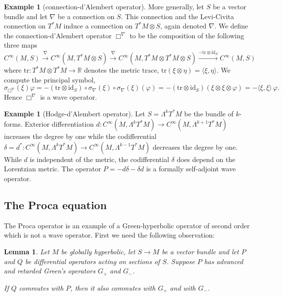 \documentclass[a4paper,11pt]{amsart}
\newtheorem{lemma}[thm]{Lemma}
\theoremstyle{definition}
\newtheorem{ex}[thm]{Example}
\begin{document}
\begin{ex}[connection-d'Alembert operator]\label{ex:boxnabla}
More generally, let $S$ be a vector bundle and let $\nabla$ be a connection on $S$.
This connection and the Levi-Civita connection on $T^*M$ induce a connection on $T^*M\otimes S$, again denoted $\nabla$.
We define the connection-d'Alembert operator $\Box^\nabla$ to be the composition of the following three maps
$$
{C^\infty}(M,S) \xrightarrow{\nabla}
{C^\infty}(M,T^*M\otimes S) \xrightarrow{\nabla}
{C^\infty}(M,T^*M\otimes T^*M\otimes S)
\xrightarrow{-{\mathrm{tr}}\otimes{\mathrm{id}}_S} 
{C^\infty}(M,S)
$$
where ${\mathrm{tr}}:T^*M\otimes T^*M \to {\mathbb{R}}$ denotes the metric trace,
${\mathrm{tr}}(\xi\otimes\eta)={\langle}\xi,\eta{\rangle}$. 
We compute the principal symbol,
$$
\sigma_{\Box^\nabla}(\xi){\varphi}
=
-({\mathrm{tr}}\otimes{\mathrm{id}}_S)\circ\sigma_{\nabla}(\xi)\circ\sigma_{\nabla}(\xi)({\varphi})
=
-({\mathrm{tr}}\otimes{\mathrm{id}}_S)(\xi\otimes\xi\otimes{\varphi})
=
-{\langle}\xi,\xi{\rangle}\,{\varphi}.
$$
Hence $\Box^\nabla$ is a wave operator.
\end{ex}

\begin{ex}[Hodge-d'Alembert operator]\label{ex:kforms}
Let $S=\Lambda^kT^*M$ be the bundle of $k$-forms.
Exterior differentiation $d:{C^\infty}(M,\Lambda^kT^*M) \to
{C^\infty}(M,\Lambda^{k+1}T^*M)$ increases the degree by one while
the codifferential $\delta=d^*:{C^\infty}(M,\Lambda^{k}T^*M) \to
{C^\infty}(M,\Lambda^{k-1}T^*M)$ decreases the degree by one.
While $d$ is independent of the metric, the codifferential $\delta$ does
depend on the Lorentzian metric.
The operator $P=-d\delta - \delta d$ is a formally self-adjoint wave operator.
\end{ex}

\subsection{The Proca equation}

The Proca operator is an example of a Green-hyperbolic operator of second order which is not a wave operator.
First we need the following observation:

\begin{lemma}
Let $M$ be globally hyperbolic, let $S\to M$ be a vector bundle and let $P$ and $Q$ be differential operators acting on sections of $S$.
Suppose $P$ has advanced and retarded Green's operators $G_+$ and $G_-$.

If $Q$ commutes with $P$, then it also commutes with $G_+$ and with $G_-$.
\end{lemma}
\end{document}
